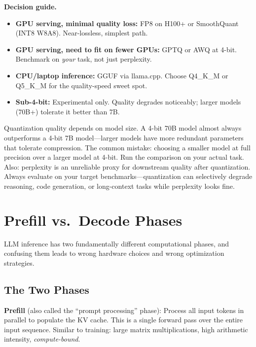 \textbf{Decision guide.}
\begin{itemize}
    \item \textbf{GPU serving, minimal quality loss:} FP8 on H100+ or SmoothQuant (INT8 W8A8). Near-lossless, simplest path.
    \item \textbf{GPU serving, need to fit on fewer GPUs:} GPTQ or AWQ at 4-bit. Benchmark on \textit{your} task, not just perplexity.
    \item \textbf{CPU/laptop inference:} GGUF via llama.cpp. Choose Q4\_K\_M or Q5\_K\_M for the quality-speed sweet spot.
    \item \textbf{Sub-4-bit:} Experimental only. Quality degrades noticeably; larger models (70B+) tolerate it better than 7B.
\end{itemize}

\begin{warningbox}
Quantization quality depends on model size. A 4-bit 70B model almost always outperforms a 4-bit 7B model---larger models have more redundant parameters that tolerate compression. The common mistake: choosing a smaller model at full precision over a larger model at 4-bit. Run the comparison on your actual task. Also: perplexity is an unreliable proxy for downstream quality after quantization. Always evaluate on your target benchmarks---quantization can selectively degrade reasoning, code generation, or long-context tasks while perplexity looks fine.
\end{warningbox}

\section{Prefill vs.\ Decode Phases}
\label{sec:prefill_decode}

LLM inference has two fundamentally different computational phases, and confusing them leads to wrong hardware choices and wrong optimization strategies.

\subsection{The Two Phases}

\textbf{Prefill} (also called the ``prompt processing'' phase): Process all input tokens in parallel to populate the KV cache. This is a single forward pass over the entire input sequence. Similar to training: large matrix multiplications, high arithmetic intensity, \textit{compute-bound}.

